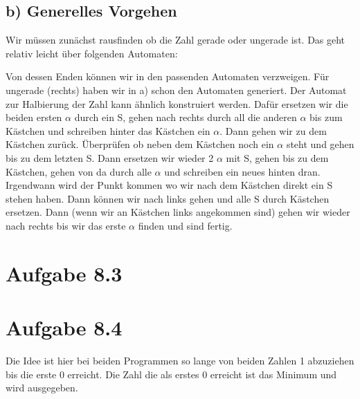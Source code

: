\documentclass{article}
\begin{document}
\subsection*{b) Generelles Vorgehen}
Wir müssen zunächst rausfinden ob die Zahl gerade oder ungerade ist. Das geht relativ leicht über folgenden Automaten:
\begin{center}
\end{center}
Von dessen Enden können wir in den passenden Automaten verzweigen. Für ungerade (rechts) haben wir in a) schon den Automaten generiert. Der Automat zur Halbierung der Zahl kann ähnlich konstruiert werden. Dafür ersetzen wir die beiden ersten $\alpha$ durch ein S, gehen nach rechts durch all die anderen $\alpha$ bis zum Kästchen und schreiben hinter das Kästchen ein $\alpha$. Dann gehen wir zu dem Kästchen zurück. Überprüfen ob neben dem Kästchen noch ein $\alpha$ steht und gehen bis zu dem letzten S. Dann ersetzen wir wieder 2 $\alpha$ mit S, gehen bis zu dem Kästchen, gehen von da durch alle $\alpha$ und schreiben ein neues hinten dran. Irgendwann wird der Punkt kommen wo wir nach dem Kästchen direkt ein S stehen haben. Dann können wir nach links gehen und alle S durch Kästchen ersetzen. Dann (wenn wir an Kästchen links angekommen sind) gehen wir wieder nach rechts bis wir das erste $\alpha$ finden und sind fertig.

\section*{Aufgabe 8.3}



\section*{Aufgabe 8.4}
Die Idee ist hier bei beiden Programmen so lange von beiden Zahlen 1 abzuziehen bis die erste 0 erreicht. Die Zahl die als erstes 0 erreicht ist das Minimum und wird ausgegeben.
\end{document}
